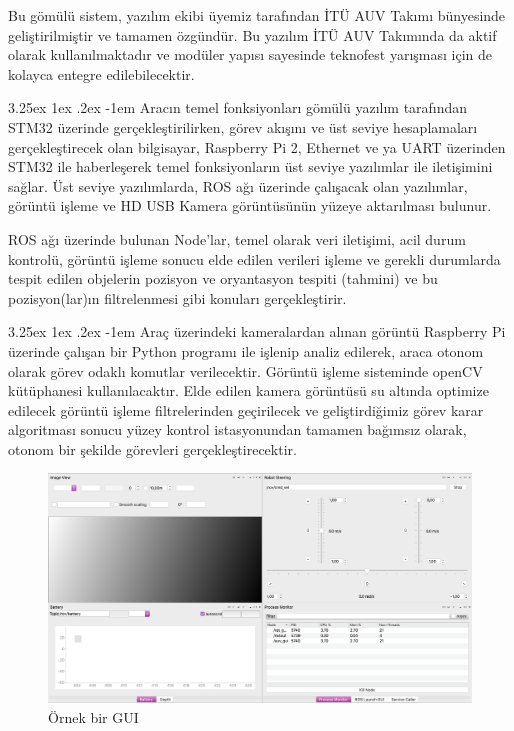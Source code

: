 \documentclass[12pt]{article}
\makeatletter
\newcounter{subsubsubsection}[subsubsection]
\renewcommand\paragraph{\@startsection{paragraph}{5}{\z@}%
  {3.25ex \@plus1ex \@minus.2ex}%
  {-1em}%
  {\normalfont\normalsize\bfseries}}
\makeatother
\begin{document}
Bu gömülü sistem, yazılım ekibi üyemiz tarafından İTÜ AUV Takımı bünyesinde geliştirilmiştir ve tamamen özgündür. Bu yazılım İTÜ AUV Takımında da aktif olarak kullanılmaktadır ve modüler yapısı sayesinde teknofest yarışması için de kolayca entegre edilebilecektir.  



\paragraph{} Aracın temel fonksiyonları gömülü yazılım tarafından STM32 üzerinde gerçekleştirilirken, görev akışını ve üst seviye hesaplamaları gerçekleştirecek olan bilgisayar, Raspberry Pi 2, Ethernet ve ya UART üzerinden STM32 ile haberleşerek temel fonksiyonların üst seviye yazılımlar ile iletişimini sağlar. Üst seviye yazılımlarda, ROS ağı üzerinde çalışacak olan yazılımlar, görüntü işleme ve HD USB Kamera görüntüsünün yüzeye aktarılması bulunur.

ROS ağı üzerinde bulunan Node'lar, temel olarak veri iletişimi, acil durum kontrolü, görüntü işleme sonucu elde edilen verileri işleme ve gerekli durumlarda tespit edilen objelerin pozisyon ve oryantasyon tespiti (tahmini) ve bu pozisyon(lar)ın filtrelenmesi gibi konuları gerçekleştirir.

\paragraph{} Araç üzerindeki kameralardan alınan görüntü Raspberry Pi üzerinde çalışan bir Python programı ile işlenip analiz edilerek, araca otonom olarak görev odaklı komutlar verilecektir. Görüntü işleme sisteminde openCV kütüphanesi kullanılacaktır. Elde edilen kamera görüntüsü su altında optimize edilecek görüntü işleme filtrelerinden\cite{ARTICLE:image_proc} geçirilecek ve geliştirdiğimiz görev karar algoritması sonucu yüzey kontrol istasyonundan tamamen bağımsız olarak, otonom bir şekilde görevleri gerçekleştirecektir.


\begin{figure}
\centering
\includegraphics[width=1\textwidth]{gui.png}
\caption{Örnek bir GUI}
\label{fig:gui}
\end{figure}
\end{document}
